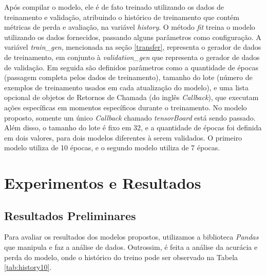 Após compilar o modelo, ele é de fato treinado utilizando os dados de treinamento e validação, atribuindo o histórico de treinamento que contém métricas de perda e avaliação, na variável \textit{history}. O método \textit{fit} treina o modelo utilizando os dados fornecidos, passando alguns parâmetros como configuração. A variável \textit{train\_gen}, mencionada na seção \ref{transfer}, representa o gerador de dados de treinamento, em conjunto à \textit{validation\_gen} que representa o gerador de dados de validação. Em seguida são definidos parâmetros como a quantidade de épocas (passagem completa pelos dados de treinamento), tamanho do lote (número de exemplos de treinamento usados em cada atualização do modelo), e uma lista opcional de objetos de Retornos de Chamada (do inglês \textit{Callback}), que executam ações específicas em momentos específicos durante o treinamento. No modelo proposto, somente um único \textit{Callback} chamado \textit{tensorBoard} está sendo passado. Além disso, o tamanho do lote é fixo em 32, e a quantidade de épocas foi definida em dois valores, para dois modelos diferentes à serem validados. O primeiro modelo utiliza de 10 épocas, e o segundo modelo utiliza de 7 épocas.



\section{\esp Experimentos e Resultados} \label{results}



\subsection{\esp Resultados Preliminares} \label{prelim}

Para avaliar os resultados dos modelos propostos, utilizamos a biblioteca \textit{Pandas} que manipula e faz a análise de dados. Outrossim, é feita a análise da acurácia e perda do modelo, onde o histórico do treino pode ser observado na Tabela \ref{tab:history10}.


